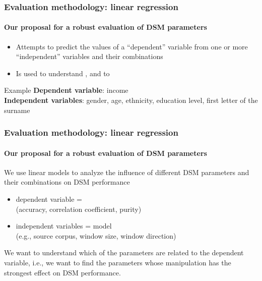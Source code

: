 \documentclass[t]{beamer} %
\begin{document}
\begin{frame}
  \frametitle{Evaluation methodology: linear regression}
  \framesubtitle{Our proposal for a robust evaluation of DSM parameters}

  \begin{itemize}
  \item Attempts to predict the values of a ``dependent'' variable from one or more ``independent'' variables and their combinations
  \item Is used to understand , and to 
  \end{itemize}

  \begin{block}{Example}
    \textbf{Dependent variable}: income \\
    \textbf{Independent variables}: gender, age, ethnicity, education level, first letter of the surname 
  \end{block}



  
\end{frame}

\begin{frame}
  \frametitle{Evaluation methodology: linear regression}
  \framesubtitle{Our proposal for a robust evaluation of DSM parameters}

  We use linear models to analyze the influence of different DSM parameters and their combinations on DSM performance
  \begin{itemize}
  \item dependent variable = \\
    (accuracy, correlation coefficient, purity)
  \item independent variables = model \\
    (e.g., source corpus, window size, window direction)
  \end{itemize}
  
  \begin{block}{}
    We want to understand which of the parameters are related to the dependent variable, i.e., we want to find the parameters whose manipulation has the strongest effect on DSM performance.
  \end{block}

\end{frame}
\end{document}
